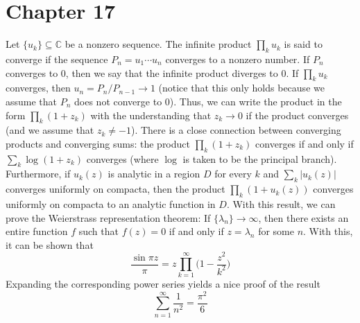 \documentclass[12pt]{article}
\newcommand{\cc}{{\mathbb C}}
\begin{document}
\section*{Chapter 17}
Let $\{u_k\} \subseteq \cc$ be a nonzero sequence. The infinite product $\prod_k u_k$ is said to converge if the sequence $P_n = u_1\cdots u_n$ converges to a nonzero number. If $P_n$ converges to $0$, then we say that the infinite product diverges to $0$. If $\prod_k u_k$ converges, then $u_n = P_n/P_{n-1} \rightarrow 1$ (notice that this only holds because we assume that $P_n$ does not converge to $0$). Thus, we can write the product in the form $\prod_k (1+z_k)$ with the understanding that $z_k \rightarrow 0$ if the product converges (and we assume that $z_k \neq -1$). There is a close connection between converging products and converging sums: the product $\prod_k (1+z_k)$ converges if and only if $\sum_k \log(1+z_k)$ converges (where $\log$ is taken to be the principal branch). Furthermore, if $u_k(z)$ is analytic in a region $D$ for every $k$ and $\sum_k \vert u_k(z) \vert$ converges uniformly on compacta, then the product $\prod_k (1+u_k(z))$ converges uniformly on compacta to an analytic function in $D$. With this result, we can prove the Weierstrass representation theorem: If $\{\lambda_n\} \rightarrow \infty$, then there exists an entire function $f$ such that $f(z) = 0$ if and only if $z = \lambda_n$ for some $n$. With this, it can be shown that
\[
\frac{\sin \pi z}{\pi} = z \prod_{k=1}^\infty \bigg(1 - \frac{z^2}{k^2}\bigg)
\] Expanding the corresponding power series yields a nice proof of the result
\[
\sum_{n=1}^\infty \frac{1}{n^2} = \frac{\pi^2}{6}
\]
\end{document}
